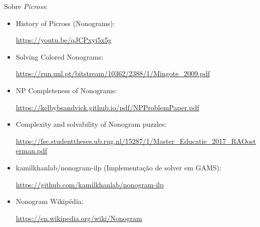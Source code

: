 \documentclass{article}
\begin{document}
\noindent
Sobre \emph{Picross}:
\begin{itemize}
    \item History of Picross (Nonograms): \par
        \url{https://youtu.be/qJCPxyi5x5g}
    \item Solving Colored Nonograms: \par
        \url{https://run.unl.pt/bitstream/10362/2388/1/Mingote_2009.pdf}
    \item NP Completeness of Nonograms: \par
        \url{https://kelbybsandvick.github.io/pdf/NPProblemPaper.pdf}
    \item Complexity and solvability of Nonogram puzzles: \par
        \url{https://fse.studenttheses.ub.rug.nl/15287/1/Master_Educatie_2017_RAOosterman.pdf}
    \item kamilkhanlab/nonogram-ilp
        (Implementação de solver em GAMS): \par
        \url{https://github.com/kamilkhanlab/nonogram-ilp}
    \item Nonogram Wikipédia: \par
        \url{https://en.wikipedia.org/wiki/Nonogram}
\end{itemize}
\end{document}
